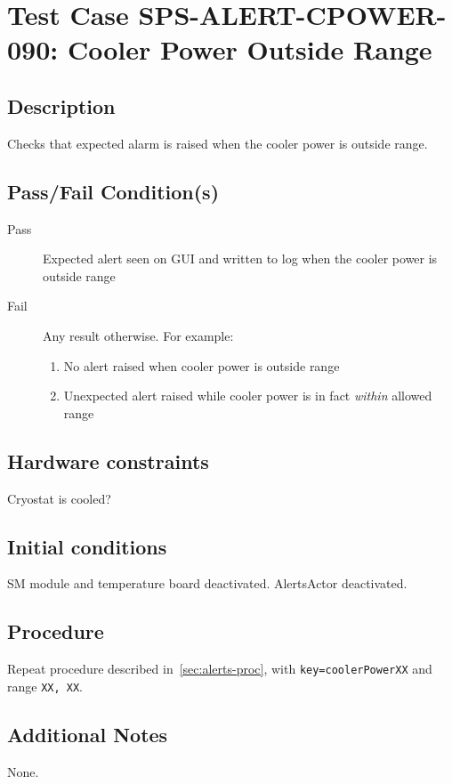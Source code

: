 \section{Test Case SPS-ALERT-CPOWER-090: Cooler Power Outside Range}

\subsection{Description}

Checks that expected alarm is raised when the cooler power is outside range.

\subsection{Pass/Fail Condition(s)}

\begin{description}
\item [Pass] Expected alert seen on GUI and written to log when the cooler power is outside range
\item [Fail] Any result otherwise. For example:

\begin{enumerate}
    \item No alert raised when cooler power is outside range
    \item Unexpected alert raised while cooler power is in fact {\it within} allowed range
\end{enumerate}
\end{description}

\subsection{Hardware constraints}

Cryostat is cooled?

\subsection{Initial conditions}

SM module and temperature board deactivated. AlertsActor deactivated.

\subsection{Procedure}

Repeat procedure described in~\ref{sec:alerts-proc}, with \texttt{key=coolerPowerXX} and range \texttt{XX, XX}.

\subsection{Additional Notes}
None.
